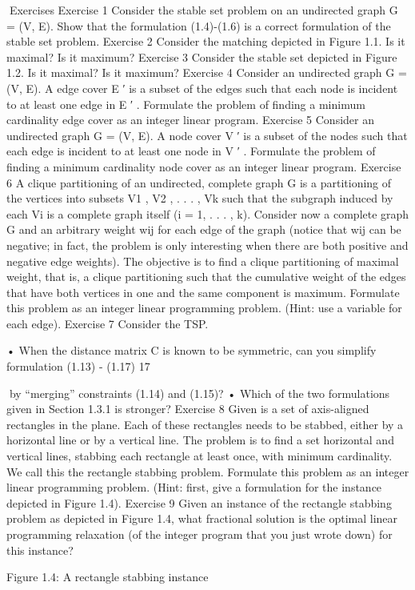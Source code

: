 \documentclass[titlepage]{book}
\begin{document}
Exercises
Exercise 1
Consider the stable set problem on an undirected graph G = (V, E). Show that the formulation (1.4)-(1.6)
is a correct formulation of the stable set problem.
Exercise 2
Consider the matching depicted in Figure 1.1. Is it maximal? Is it maximum?
Exercise 3
Consider the stable set depicted in Figure 1.2. Is it maximal? Is it maximum?
Exercise 4
Consider an undirected graph G = (V, E). A edge cover E ′ is a subset of the edges such that each node is
incident to at least one edge in E ′ . Formulate the problem of finding a minimum cardinality edge cover
as an integer linear program.
Exercise 5
Consider an undirected graph G = (V, E). A node cover V ′ is a subset of the nodes such that each edge
is incident to at least one node in V ′ . Formulate the problem of finding a minimum cardinality node
cover as an integer linear program.
Exercise 6
A clique partitioning of an undirected, complete graph G is a partitioning of the vertices into subsets
V1 , V2 , . . . , Vk such that the subgraph induced by each Vi is a complete graph itself (i = 1, . . . , k). Consider
now a complete graph G and an arbitrary weight wij for each edge of the graph (notice that wij can be
negative; in fact, the problem is only interesting when there are both positive and negative edge weights).
The objective is to find a clique partitioning of maximal weight, that is, a clique partitioning such that
the cumulative weight of the edges that have both vertices in one and the same component is maximum.
Formulate this problem as an integer linear programming problem. (Hint: use a variable for each edge).
Exercise 7
Consider the TSP.

• When the distance matrix C is known to be symmetric, can you simplify formulation (1.13) - (1.17)
17

by “merging” constraints (1.14) and (1.15)?
• Which of the two formulations given in Section 1.3.1 is stronger?
Exercise 8
Given is a set of axis-aligned rectangles in the plane. Each of these rectangles needs to be stabbed, either
by a horizontal line or by a vertical line. The problem is to find a set horizontal and vertical lines, stabbing
each rectangle at least once, with minimum cardinality. We call this the rectangle stabbing problem.
Formulate this problem as an integer linear programming problem. (Hint: first, give a formulation for
the instance depicted in Figure 1.4).
Exercise 9
Given an instance of the rectangle stabbing problem as depicted in Figure 1.4, what fractional solution
is the optimal linear programming relaxation (of the integer program that you just wrote down) for this
instance?

Figure 1.4: A rectangle stabbing instance
\end{document}
